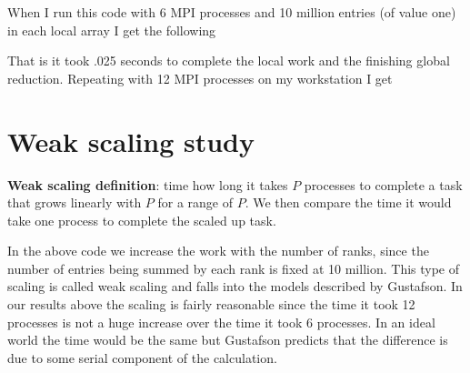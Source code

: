 When I run this code with 6 MPI processes and 10 million entries (of value one) in each local array I get the following


That is it took .025 seconds to complete the local work and the finishing global reduction. Repeating with 12 MPI processes on my workstation I get


\section{Weak scaling study}

{\bf Weak scaling definition}: time how long it takes $P$ processes to complete a task that grows linearly with $P$ for a range of $P$. We then compare the time it would take one process to complete the scaled up task.

In the above code we increase the work with the number of ranks, since the number of entries being summed by each rank is fixed at 10 million. This type of scaling is called weak scaling and falls into the models described by Gustafson. In our results above the scaling is fairly reasonable since the time it took 12 processes is not a huge increase over the time it took 6 processes. In an ideal world the time would be the same but Gustafson predicts that the difference is due to some serial component of the calculation.

